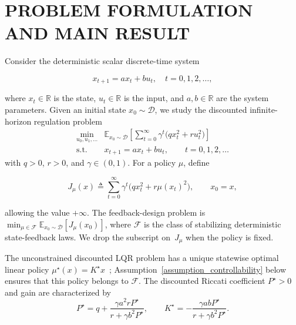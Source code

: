 \documentclass[letterpaper, 10 pt, conference]{ieeeconf}
\newcommand{\E}{\mathbb{E}}
\newcommand{\R}{\mathbb{R}}
\newcommand{\cD}{\mathcal{D}}
\newcommand{\cF}{\mathcal{F}}
\DeclareMathOperator*{\st}{s.t.}
\newcommand{\Assum}{Assumption}
\begin{document}
\section{PROBLEM FORMULATION AND MAIN RESULT}
\label{section_problem_formulation}

Consider the deterministic scalar discrete-time system

\vspace{-0.3cm}
\begin{equation} \label{eq_dynamics}
    x_{t+1} = a x_t + b u_t, \quad t=0,1,2,\dots,
\end{equation}
\vspace{-0.4cm}

\noindent where $x_t \in \R$ is the state, $u_t \in \R$ is the input, and $a,b \in \R$ are the system parameters. Given an initial state $x_0 \sim \cD$, we study the discounted infinite-horizon regulation problem
\begin{equation} \label{eq_org_problem}
    \begin{array}{cl}
        \underset{u_0,u_1,\ldots}{\min}
        &
        \E_{x_{0} \sim \cD} \left[\sum_{t=0}^{\infty} \gamma^{t} \bigl( qx_{t}^{2} + ru_{t}^{2} \bigr) \right]
        \\
        \st & x_{t+1} = ax_{t} + bu_{t}, \qquad t=0,1,2,\ldots
    \end{array}
\end{equation}
with $q>0$, $r>0$, and $\gamma\in(0,1)$. For a  policy $\mu$, define

\vspace{-0.5cm}
\[
J_\mu(x)\triangleq\sum_{t=0}^{\infty}\gamma^t
\bigl(qx_t^2+r\mu(x_t)^2\bigr),
\qquad x_0=x,
\]
\vspace{-0.3cm}

\noindent allowing the value $+\infty$. The feedback-design problem is
$\min_{\mu\in\cF}\E_{x_0\sim\cD}[J_\mu(x_0)]$, where $\cF$ is the class of stabilizing deterministic state-feedback laws. We drop the subscript on~$J_\mu$ when the policy is fixed. 

The unconstrained discounted LQR problem has a unique statewise optimal linear policy $\mu^\star(x)=K^\star x$~\cite{anderson1989optimal}; \Assum~\ref{assumption_controllability} below ensures that this policy belongs to $\cF$.
The discounted Riccati coefficient $P^{\star}>0$ and gain are characterized by
\begin{equation}\label{eq_riccati}
    P^{\star}=q+\frac{\gamma a^{2}rP^{\star}}{r+\gamma b^{2}P^{\star}},
    \qquad K^{\star}=-\frac{\gamma abP^{\star}}{r+\gamma b^{2}P^{\star}}.
\end{equation}
\end{document}
